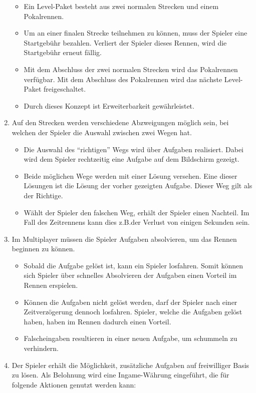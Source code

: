 \begin{enumerate}
		\begin{itemize}
			\item{Ein Level-Paket besteht aus zwei normalen Strecken und einem Pokalrennen.}
			\item{Um an einer finalen Strecke teilnehmen zu können, muss der Spieler eine Startgebühr bezahlen. Verliert der Spieler dieses Rennen, wird die Startgebühr erneut fällig.}
			\item{Mit dem Abschluss der zwei normalen Strecken wird das Pokalrennen verfügbar. Mit dem Abschluss des Pokalrennen wird das nächste Level-Paket freigeschaltet.}
			\item{Durch dieses Konzept ist Erweiterbarkeit gewährleistet.}
		\end{itemize}
		\item{Auf den Strecken werden verschiedene Abzweigungen möglich sein, bei welchen der Spieler die Auswahl zwischen zwei Wegen hat.}
		\begin{itemize}
			\item{Die Auswahl des \enquote{richtigen} Wegs wird über Aufgaben realisiert. Dabei wird dem Spieler rechtzeitig eine Aufgabe auf dem Bildschirm gezeigt.}
			\item{Beide möglichen Wege werden mit einer Lösung versehen. Eine dieser Lösungen ist die Lösung der vorher gezeigten Aufgabe. Dieser Weg gilt als der Richtige.}
			\item{Wählt der Spieler den falschen Weg, erhält der Spieler einen Nachteil. Im Fall des Zeitrennens kann dies z.B.\@ der Verlust von einigen Sekunden sein.}
		\end{itemize}
		\item{Im Multiplayer müssen die Spieler Aufgaben absolvieren, um das Rennen beginnen zu können.}
			\begin{itemize}
				\item{Sobald die Aufgabe gelöst ist, kann ein Spieler losfahren. Somit können sich Spieler über schnelles Absolvieren der Aufgaben einen Vorteil im Rennen erspielen.}
				\item{Können die Aufgaben nicht gelöst werden, darf der Spieler nach einer Zeitverzögerung dennoch losfahren. Spieler, welche die Aufgaben gelöst haben, haben im Rennen dadurch einen Vorteil.}
				\item{Falscheingaben resultieren in einer neuen Aufgabe, um schummeln zu verhindern.}
			\end{itemize}
		\item{Der Spieler erhält die Möglichkeit, zusätzliche Aufgaben auf freiwilliger Basis zu lösen. Als Belohnung wird eine Ingame-Währung eingeführt, die für folgende Aktionen genutzt werden kann:}

\end{enumerate}
